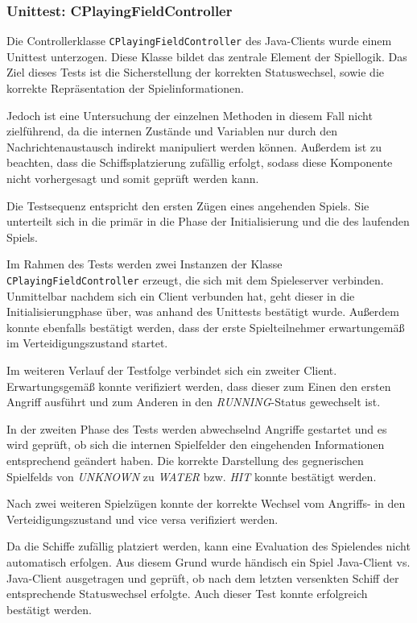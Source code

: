 \subsubsection{Unittest: CPlayingFieldController}
Die Controllerklasse \texttt{CPlayingFieldController} des Java-Clients wurde einem Unittest unterzogen.
Diese Klasse bildet das zentrale Element der Spiellogik.
Das Ziel dieses Tests ist die Sicherstellung der korrekten Statuswechsel, sowie die korrekte Repräsentation der Spielinformationen.

Jedoch ist eine Untersuchung der einzelnen Methoden in diesem Fall nicht zielführend, da die internen Zustände und Variablen nur durch den Nachrichtenaustausch indirekt manipuliert werden können.
Außerdem ist zu beachten, dass die Schiffsplatzierung zufällig erfolgt, sodass diese Komponente nicht vorhergesagt und somit geprüft werden kann.

Die Testsequenz entspricht den ersten Zügen eines angehenden Spiels. 
Sie unterteilt sich in die primär in die Phase der Initialisierung und die des laufenden Spiels.

Im Rahmen des Tests werden zwei Instanzen der Klasse \texttt{CPlayingFieldController} erzeugt, die sich mit dem Spieleserver verbinden.
Unmittelbar nachdem sich ein Client verbunden hat, geht dieser in die Initialisierungphase über, was anhand des Unittests bestätigt wurde.
Außerdem konnte ebenfalls bestätigt werden, dass der erste Spielteilnehmer erwartungemäß im Verteidigungszustand startet.

Im weiteren Verlauf der Testfolge verbindet sich ein zweiter Client.
Erwartungsgemäß konnte verifiziert werden, dass dieser zum Einen den ersten Angriff ausführt und zum Anderen in den \emph{RUNNING}-Status gewechselt ist.

In der zweiten Phase des Tests werden abwechselnd Angriffe gestartet und es wird geprüft, ob sich die internen Spielfelder den eingehenden Informationen entsprechend geändert haben.
Die korrekte Darstellung des gegnerischen Spielfelds von \emph{UNKNOWN} zu \emph{WATER} bzw. \emph{HIT} konnte bestätigt werden.

Nach zwei weiteren Spielzügen konnte der korrekte Wechsel vom Angriffs- in den Verteidigungszustand und vice versa verifiziert werden.

Da die Schiffe zufällig platziert werden, kann eine Evaluation des Spielendes nicht automatisch erfolgen.
Aus diesem Grund wurde händisch ein Spiel Java-Client vs. Java-Client ausgetragen und geprüft, ob nach dem letzten versenkten Schiff der entsprechende Statuswechsel erfolgte.
Auch dieser Test konnte erfolgreich bestätigt werden.